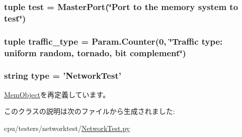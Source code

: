 \label{classNetworkTest_1_1NetworkTest_ab737471139f5a296e5b26e8a0e1b0744}
\hypertarget{classNetworkTest_1_1NetworkTest_ae2be30e6b14c541b72cb62bdb6169fab}{
\subsubsection[{test}]{\setlength{\rightskip}{0pt plus 5cm}tuple {\bf test} = {\bf MasterPort}(\char`\"{}Port to the memory {\bf system} to {\bf test}\char`\"{})}}
\label{classNetworkTest_1_1NetworkTest_ae2be30e6b14c541b72cb62bdb6169fab}
\hypertarget{classNetworkTest_1_1NetworkTest_a4f8761a54993f21e9ab9312bebac059b}{
\subsubsection[{traffic\_\-type}]{\setlength{\rightskip}{0pt plus 5cm}tuple {\bf traffic\_\-type} = {\bf Param.Counter}(0, \char`\"{}Traffic type: uniform random, tornado, bit complement\char`\"{})}}
\label{classNetworkTest_1_1NetworkTest_a4f8761a54993f21e9ab9312bebac059b}
\hypertarget{classNetworkTest_1_1NetworkTest_acce15679d830831b0bbe8ebc2a60b2ca}{
\subsubsection[{type}]{\setlength{\rightskip}{0pt plus 5cm}string {\bf type} = '{\bf NetworkTest}'}}
\label{classNetworkTest_1_1NetworkTest_acce15679d830831b0bbe8ebc2a60b2ca}


\hyperlink{classMemObject_1_1MemObject_acce15679d830831b0bbe8ebc2a60b2ca}{MemObject}を再定義しています。

このクラスの説明は次のファイルから生成されました:\begin{DoxyCompactItemize}
\item 
cpu/testers/networktest/\hyperlink{NetworkTest_8py}{NetworkTest.py}\end{DoxyCompactItemize}
